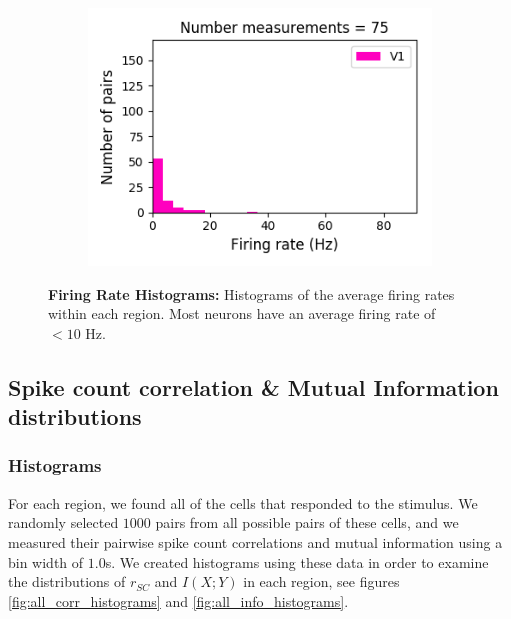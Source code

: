 \documentclass[a4paper,12pt]{article}
\theoremstyle{definition}
\begin{document}
\begin{figure}[p]
\begin{subfigure}{0.5\textwidth}
    \includegraphics[width=\textwidth]{figures/all_v1_8_1p0_firing_rate_histogram.png}
  \end{subfigure}
  \caption{\textbf{Firing Rate Histograms:} Histograms of the average firing rates within each region. Most neurons have an average firing rate of $< 10$ Hz.}
  \label{fig:firing_rate_histograms}
\end{figure}

\subsection{Spike count correlation \& Mutual Information distributions}

\subsubsection{Histograms}\label{sec:histograms}
For each region, we found all of the cells that responded to the stimulus. We randomly selected $1000$ pairs from all possible pairs of these cells, and we measured their pairwise  spike count correlations and mutual information using a bin width of $1.0$s. We created histograms using these data in order to examine the distributions of $r_{SC}$ and $I(X;Y)$ in each region, see figures \ref{fig:all_corr_histograms} and \ref{fig:all_info_histograms}.
\end{document}
